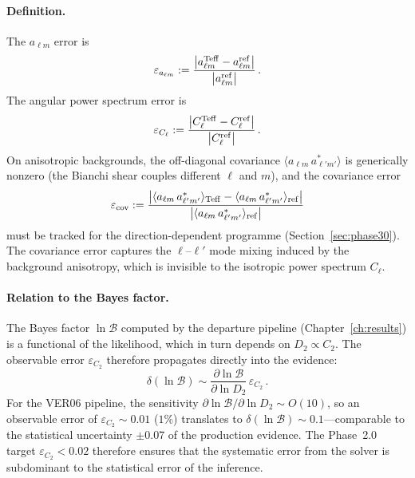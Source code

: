 \paragraph{Definition.}

The $a_{\ell m}$ error is
\begin{equation}\label{eq:err-alm}
\varepsilon_{a_{\ell m}}
:= \frac{
  \big|
    a_{\ell m}^{\rm Teff}
    - a_{\ell m}^{\rm ref}
  \big|
}{
  \big| a_{\ell m}^{\rm ref} \big|
}\,.
\end{equation}
The angular power spectrum error is
\begin{equation}\label{eq:err-Cl}
\varepsilon_{C_\ell}
:= \frac{
  \big|
    C_\ell^{\rm Teff}
    - C_\ell^{\rm ref}
  \big|
}{
  \big| C_\ell^{\rm ref} \big|
}\,.
\end{equation}
On anisotropic backgrounds, the off-diagonal covariance
$\langle a_{\ell m}\,a_{\ell' m'}^* \rangle$ is generically
nonzero (the Bianchi shear couples different $\ell$ and $m$),
and the covariance error
\begin{equation}\label{eq:err-cov}
\varepsilon_{\rm cov}
:= \frac{
  \big|
    \langle a_{\ell m}\,a_{\ell' m'}^* \rangle_{\rm Teff}
    - \langle a_{\ell m}\,a_{\ell' m'}^* \rangle_{\rm ref}
  \big|
}{
  \big|
    \langle a_{\ell m}\,a_{\ell' m'}^* \rangle_{\rm ref}
  \big|
}
\end{equation}
must be tracked for the direction-dependent programme
(Section~\ref{sec:phase30}).  The covariance error
captures the $\ell$--$\ell'$ mode mixing induced by
the background anisotropy, which is invisible to the
isotropic power spectrum $C_\ell$.


\paragraph{Relation to the Bayes factor.}

The Bayes factor $\ln \mathcal{B}$ computed by the
departure pipeline (Chapter~\ref{ch:results}) is a
functional of the likelihood, which in turn depends on
$D_2 \propto C_2$.  The observable error
$\varepsilon_{C_2}$ therefore propagates directly into the
evidence:
\begin{equation}\label{eq:err-lnB}
\delta(\ln \mathcal{B})
\sim \frac{\partial \ln \mathcal{B}}
          {\partial \ln D_2}\,
     \varepsilon_{C_2}\,.
\end{equation}
For the VER06 pipeline, the sensitivity
$\partial \ln \mathcal{B} / \partial \ln D_2 \sim
O(10)$, so an observable error of $\varepsilon_{C_2}
\sim 0.01$ ($1\%$) translates to
$\delta(\ln \mathcal{B}) \sim 0.1$---comparable to the
statistical uncertainty $\pm 0.07$ of the production
evidence.  The Phase~2.0 target
$\varepsilon_{C_2} < 0.02$ therefore ensures that the
systematic error from the solver is subdominant to the
statistical error of the inference.


